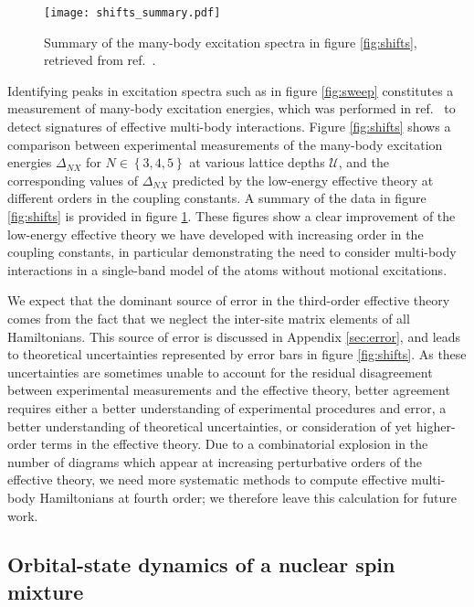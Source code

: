 \documentclass[preprint,showkeys,nofootinbib]{revtex4-1}
\renewcommand{\set}[1]{\left\{#1\right\}} %
\newcommand{\U}{\mathcal{U}}
\newcommand{\1}{\mathds{1}}
\begin{document}
\begin{figure}
  \centering
  \texttt{[image: shifts\_summary.pdf]}
  \caption{\footnotesize Summary of the many-body excitation spectra
    in figure \ref{fig:shifts}, retrieved from
    ref.~\cite{goban2018emergence}.}
  \label{fig:shifts_summary}
\end{figure}

Identifying peaks in excitation spectra such as in figure
\ref{fig:sweep} constitutes a measurement of many-body excitation
energies, which was performed in ref.~\cite{goban2018emergence} to
detect signatures of effective multi-body interactions.  Figure
\ref{fig:shifts} shows a comparison between experimental measurements
of the many-body excitation energies $\Delta_{NX}$ for
$N\in\set{3,4,5}$ at various lattice depths $\U$, and the
corresponding values of $\Delta_{NX}$ predicted by the low-energy
effective theory at different orders in the coupling constants.  A
summary of the data in figure \ref{fig:shifts} is provided in figure
\ref{fig:shifts_summary}.  These figures show a clear improvement of
the low-energy effective theory we have developed with increasing
order in the coupling constants, in particular demonstrating the need
to consider multi-body interactions in a single-band model of the
atoms without motional excitations.

We expect that the dominant source of error in the third-order
effective theory comes from the fact that we neglect the inter-site
matrix elements of all Hamiltonians.  This source of error is
discussed in Appendix \ref{sec:error}, and leads to theoretical
uncertainties represented by error bars in figure \ref{fig:shifts}.
As these uncertainties are sometimes unable to account for the
residual disagreement between experimental measurements and the
effective theory, better agreement requires either a better
understanding of experimental procedures and error, a better
understanding of theoretical uncertainties, or consideration of yet
higher-order terms in the effective theory.  Due to a combinatorial
explosion in the number of diagrams which appear at increasing
perturbative orders of the effective theory, we need more systematic
methods to compute effective multi-body Hamiltonians at fourth order;
we therefore leave this calculation for future work.


\subsection{Orbital-state dynamics of a nuclear spin mixture}
\end{document}
